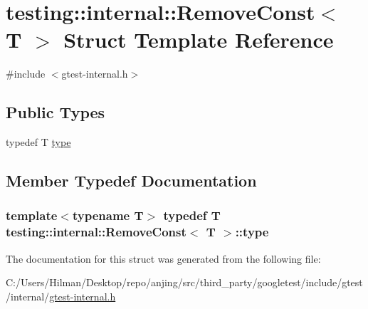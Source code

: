 \hypertarget{structtesting_1_1internal_1_1_remove_const}{}\section{testing\+:\+:internal\+:\+:Remove\+Const$<$ T $>$ Struct Template Reference}
\label{structtesting_1_1internal_1_1_remove_const}


{\ttfamily \#include $<$gtest-\/internal.\+h$>$}

\subsection*{Public Types}
\begin{DoxyCompactItemize}
\item 
typedef T \hyperlink{structtesting_1_1internal_1_1_remove_const_a1be32027ea4edcc0d15abd59aba4a97f}{type}
\end{DoxyCompactItemize}


\subsection{Member Typedef Documentation}
\hypertarget{structtesting_1_1internal_1_1_remove_const_a1be32027ea4edcc0d15abd59aba4a97f}{}
\subsubsection[{type}]{\setlength{\rightskip}{0pt plus 5cm}template$<$typename T$>$ typedef T {\bf testing\+::internal\+::\+Remove\+Const}$<$ T $>$\+::{\bf type}}\label{structtesting_1_1internal_1_1_remove_const_a1be32027ea4edcc0d15abd59aba4a97f}


The documentation for this struct was generated from the following file\+:\begin{DoxyCompactItemize}
\item 
C\+:/\+Users/\+Hilman/\+Desktop/repo/anjing/src/third\+\_\+party/googletest/include/gtest/internal/\hyperlink{gtest-internal_8h}{gtest-\/internal.\+h}\end{DoxyCompactItemize}

